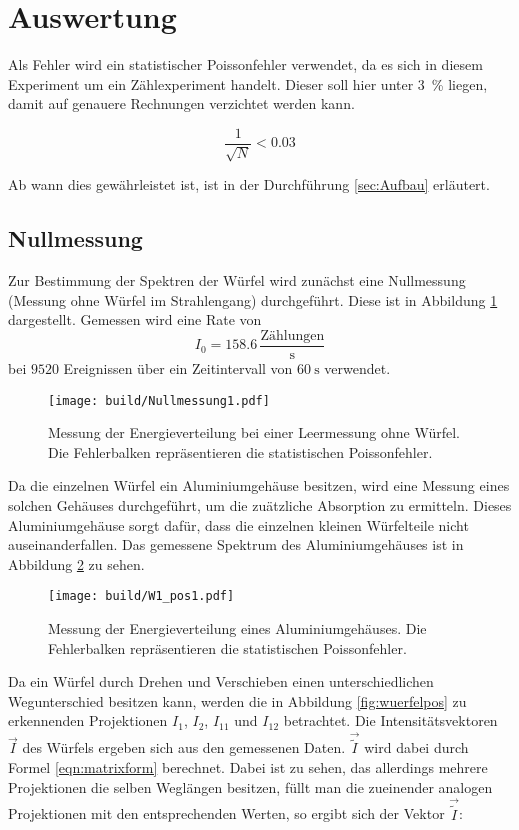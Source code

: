 \newpage
\section{Auswertung}

\label{sec:Auswertung}

Als Fehler wird ein statistischer Poissonfehler verwendet, da es sich in diesem
Experiment um ein Zählexperiment handelt. Dieser soll hier unter \SI{3}{\percent} liegen,
damit auf genauere Rechnungen verzichtet werden kann.

\begin{equation*}
  \frac{1}{\sqrt{N}} < 0.03
\end{equation*}

Ab wann dies gewährleistet ist, ist in der Durchführung \ref{sec:Aufbau} erläutert.

\subsection{Nullmessung}
Zur Bestimmung der Spektren der Würfel wird zunächst eine Nullmessung (Messung
ohne Würfel im Strahlengang) durchgeführt. Diese ist in Abbildung \ref{fig:leer}
dargestellt. Gemessen wird eine Rate von
\begin{equation*}
    I_0 = 158.6 \,\frac{\text{Zählungen}}{\text{s}}
\end{equation*}
bei $9520$ Ereignissen über ein Zeitintervall von $\SI{60}{\second}$ verwendet.

\begin{figure}[htb]
  \centering
  \texttt{[image: build/Nullmessung1.pdf]}
  \caption{Messung der Energieverteilung bei einer Leermessung ohne Würfel. Die
  Fehlerbalken repräsentieren die statistischen Poissonfehler.}
  \label{fig:leer}
\end{figure}
\FloatBarrier
Da die einzelnen Würfel ein Aluminiumgehäuse besitzen, wird eine Messung eines solchen
Gehäuses durchgeführt, um die zuätzliche Absorption zu ermitteln. Dieses Aluminiumgehäuse
sorgt dafür, dass die einzelnen kleinen Würfelteile nicht auseinanderfallen. Das
gemessene Spektrum des Aluminiumgehäuses ist in
Abbildung \ref{fig:alu} zu sehen.

\begin{figure}[htb]
  \centering
  \texttt{[image: build/W1\_pos1.pdf]}
  \caption{Messung der Energieverteilung eines Aluminiumgehäuses. Die Fehlerbalken
  repräsentieren die statistischen Poissonfehler.}
  \label{fig:alu}
\end{figure}
\FloatBarrier
Da ein Würfel durch Drehen und Verschieben einen unterschiedlichen Wegunterschied
besitzen kann, werden die in Abbildung \ref{fig:wuerfelpos} zu erkennenden Projektionen
$I_1$, $I_2$, $I_{11}$ und $I_{12}$ betrachtet. Die Intensitätsvektoren $\vec{I}$ des Würfels ergeben sich aus
den gemessenen Daten. $\vec{\tilde{I}}$ wird dabei durch Formel \eqref{eqn:matrixform} berechnet.
Dabei ist zu sehen, das allerdings mehrere Projektionen die selben Weglängen
besitzen, füllt man die zueinender analogen Projektionen mit den entsprechenden Werten,
so ergibt sich der Vektor $\vec{\tilde{I}}$:

